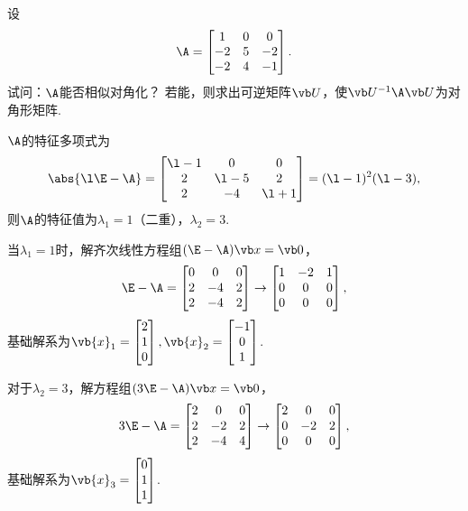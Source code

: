 \begin{example}
设\[
	\A = \begin{bmatrix}
		1 & 0 & 0 \\
		-2 & 5 & -2 \\
		-2 & 4 & -1
	\end{bmatrix}.
\]
试问：\(\A\)能否相似对角化？
若能，则求出可逆矩阵\(\P\)，使\(\P^{-1}\A\P\)为对角形矩阵.
\begin{solution}
\(\A\)的特征多项式为\[
	\abs{\l\E-\A} = \begin{bmatrix}
		\l-1 & 0 & 0 \\
		2 & \l-5 & 2 \\
		2 & -4 & \l+1
	\end{bmatrix}
	= (\l-1)^2 (\l-3),
\]
则\(\A\)的特征值为\(\lambda_1=1\)（二重），\(\lambda_2=3\).

当\(\lambda_1=1\)时，解齐次线性方程组\((\E-\A)\x=\vb0\)，\[
	\E-\A=\begin{bmatrix}
		0 & 0 & 0 \\
		2 & -4 & 2 \\
		2 & -4 & 2
	\end{bmatrix}
	\to \begin{bmatrix}
		1 & -2 & 1 \\
		0 & 0 & 0 \\
		0 & 0 & 0
	\end{bmatrix},
\]
基础解系为\(\vb{x}_1 = \begin{bmatrix} 2 \\ 1 \\ 0 \end{bmatrix},
\vb{x}_2 = \begin{bmatrix} -1 \\ 0 \\ 1 \end{bmatrix}\).

对于\(\lambda_2=3\)，解方程组\((3\E-\A)\x=\vb0\)，\[
	3\E-\A=\begin{bmatrix}
		2 & 0 & 0 \\
		2 & -2 & 2 \\
		2 & -4 & 4
	\end{bmatrix} \to \begin{bmatrix}
		2 & 0 & 0 \\
		0 & -2 & 2 \\
		0 & 0 & 0
	\end{bmatrix},
\]
基础解系为\(\vb{x}_3 = \begin{bmatrix} 0 \\ 1 \\ 1 \end{bmatrix}\).


\end{solution}
\end{example}

